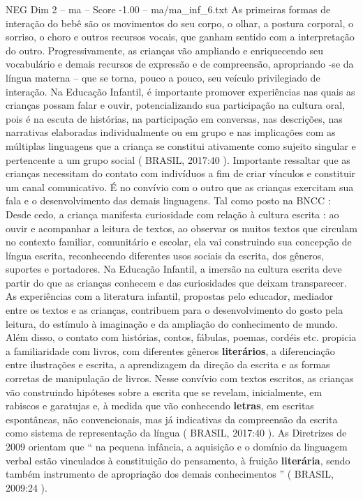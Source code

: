 \begin{textsample}{NEG Dim 2 – ma – Score -1.00 – ma/ma\_inf\_6.txt}
As primeiras formas de interação do bebê são os movimentos do seu corpo, o olhar, a postura corporal, o sorriso, o choro e outros recursos vocais, que ganham sentido com a interpretação do outro.
Progressivamente, as crianças vão ampliando e enriquecendo seu vocabulário e demais recursos de expressão e de compreensão, apropriando -se da língua materna – que se torna, pouco a pouco, seu veículo privilegiado de interação.
Na Educação Infantil, é importante promover experiências nas quais as crianças possam falar e ouvir, potencializando sua participação na cultura oral, pois é na escuta de histórias, na participação em conversas, nas descrições, nas narrativas elaboradas individualmente ou em grupo e nas implicações com as múltiplas linguagens que a criança se constitui ativamente como sujeito singular e pertencente a um grupo social ( BRASIL, 2017:40 ).
Importante ressaltar que as crianças necessitam do contato com indivíduos a fim de criar vínculos e constituir um canal comunicativo.
É no convívio com o outro que as crianças exercitam sua fala e o desenvolvimento das demais linguagens.
Tal como posto na BNCC : Desde cedo, a criança manifesta curiosidade com relação à cultura escrita : ao ouvir e acompanhar a leitura de textos, ao observar os muitos textos que circulam no contexto familiar, comunitário e escolar, ela vai construindo sua concepção de língua escrita, reconhecendo diferentes usos sociais da escrita, dos gêneros, suportes e portadores.
Na Educação Infantil, a imersão na cultura escrita deve partir do que as crianças conhecem e das curiosidades que deixam transparecer.
As experiências com a literatura infantil, propostas pelo educador, mediador entre os textos e as crianças, contribuem para o desenvolvimento do gosto pela leitura, do estímulo à imaginação e da ampliação do conhecimento de mundo.
Além disso, o contato com histórias, contos, fábulas, poemas, cordéis etc. propicia a familiaridade com livros, com diferentes gêneros \textbf{literários}, a diferenciação entre ilustrações e escrita, a aprendizagem da direção da escrita e as formas corretas de manipulação de livros.
Nesse convívio com textos escritos, as crianças vão construindo hipóteses sobre a escrita que se revelam, inicialmente, em rabiscos e garatujas e, à medida que vão conhecendo \textbf{letras}, em escritas espontâneas, não convencionais, mas já indicativas da compreensão da escrita como sistema de representação da língua ( BRASIL, 2017:40 ).
As Diretrizes de 2009 orientam que “ na pequena infância, a aquisição e o domínio da linguagem verbal estão vinculados à constituição do pensamento, à fruição \textbf{literária}, sendo também instrumento de apropriação dos demais conhecimentos ” ( BRASIL, 2009:24 ).

\end{textsample}
